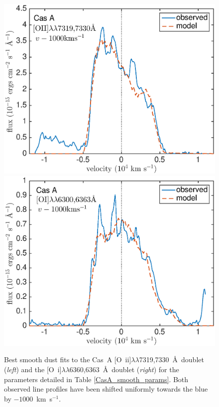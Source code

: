 \begin{figure}
\centering
\includegraphics[scale=0.41,clip=true, trim=15 0 40 20]{chapters/chapter6/figs/CasA/CasA_shifted1000_OII}
\includegraphics[scale=0.41,clip=true, trim=15 0 40 20]{chapters/chapter6/figs/CasA/CasA_OI_shifted1000}
\caption{Best smooth dust fits to the Cas~A [O~{\sc ii}]$\lambda\lambda$7319,7330~\AA\  doublet ({\em left}) and the [O~{\sc i}]$\lambda\lambda$6360,6363~\AA\  doublet ({\em right}) for the parameters detailed in Table \ref{CasA_smooth_params}.  Both observed line profiles have been shifted uniformly towards the blue by $-1000$~km~s$^{-1}$.}
\label{CasA_OI_OII}
\end{figure}

